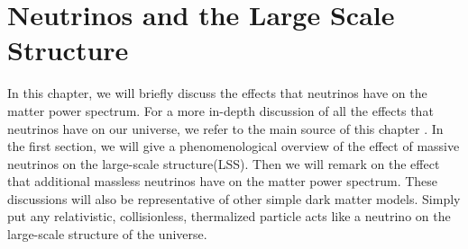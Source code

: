 \documentclass[../main.tex]{subfiles}
\begin{document}
\chapter{Neutrinos and the Large Scale Structure}
In this chapter, we will briefly discuss the effects that neutrinos have on the matter power spectrum. For a more in-depth discussion of all the effects that neutrinos have on our universe, we refer to the main source of this chapter \cite{lesgourgues_mangano_miele_pastor_2013}. In the first section, we will give a phenomenological overview of the effect of massive neutrinos on the large-scale structure(LSS). Then we will remark on the effect that additional massless neutrinos have on the matter power spectrum. These discussions will also be representative of other simple dark matter models. Simply put any relativistic, collisionless, thermalized particle acts like a neutrino on the large-scale structure of the universe.
\end{document}
